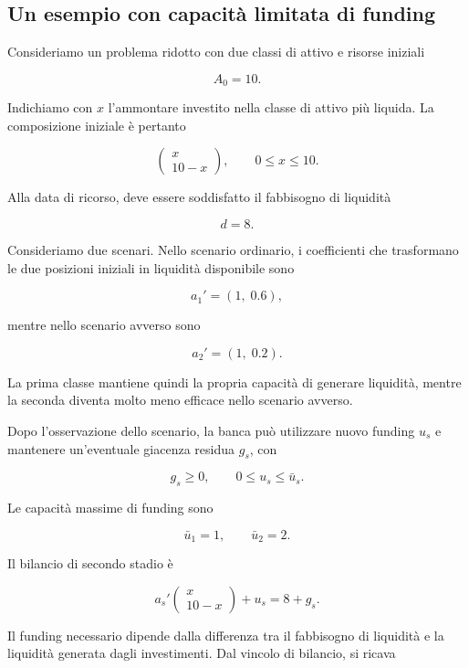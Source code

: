 \subsection{Un esempio con capacit\`a limitata di funding}

Consideriamo un problema ridotto con due classi di attivo e risorse iniziali

\[
A_0=10.
\]

Indichiamo con $x$ l'ammontare investito nella classe di attivo pi\`u liquida.
La composizione iniziale \`e pertanto

\[
\begin{pmatrix}
x\\
10-x
\end{pmatrix},
\qquad
0\leq x\leq10.
\]

Alla data di ricorso, deve essere soddisfatto il fabbisogno di liquidit\`a

\[
d=8.
\]

Consideriamo due scenari. Nello scenario ordinario, i coefficienti che
trasformano le due posizioni iniziali in liquidit\`a disponibile sono

\[
a_1'
=
(1,\;0.6),
\]

\noindent mentre nello scenario avverso sono

\[
a_2'
=
(1,\;0.2).
\]

La prima classe mantiene quindi la propria capacit\`a di generare liquidit\`a,
mentre la seconda diventa molto meno efficace nello scenario avverso.

Dopo l'osservazione dello scenario, la banca pu\`o utilizzare nuovo funding
$u_s$ e mantenere un'eventuale giacenza residua $g_s$, con

\[
g_s\geq0,
\qquad
0\leq u_s\leq\bar u_s.
\]

Le capacit\`a massime di funding sono

\[
\bar u_1=1,
\qquad
\bar u_2=2.
\]

Il bilancio di secondo stadio \`e

\[
a_s'
\begin{pmatrix}
x\\
10-x
\end{pmatrix}
+
u_s
=
8+g_s.
\]



Il funding necessario dipende dalla differenza tra
il fabbisogno di liquidit\`{a} e la liquidit\`{a}
generata dagli investimenti. Dal vincolo di bilancio,
si ricava


